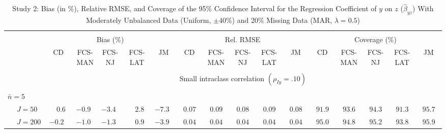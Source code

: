 \begin{sidewaystable}
\begin{threeparttable}
\setlength{\tabcolsep}{1.0pt}
\renewcommand{\arraystretch}{0.95}
\footnotesize
\caption{\small Study 2: Bias (in \%), Relative RMSE, and Coverage of the 95\% Confidence Interval for the Regression Coefficient of $y$ on $z$ ($\hat\beta_{yz}$) With Moderately Unbalanced Data (Uniform, $\pm 40\%$) and 20\% Missing Data (MAR, $\lambda=0.5$)}
\begin{tabular}{llccccccccccccccc}
\hline\\[-1.8ex]
& & \multicolumn{5}{c}{Bias (\%)} & \multicolumn{5}{c}{Rel. RMSE} & \multicolumn{5}{c}{Coverage (\%)} \\ \cmidrule(r){3-7}\cmidrule(r){8-12}\cmidrule(r){13-17}
 &  & CD & \makecell{FCS-\\MAN} & \makecell{FCS-\\NJ} & \makecell{FCS-\\LAT} & JM & CD & \makecell{FCS-\\MAN} & \makecell{FCS-\\NJ} & \makecell{FCS-\\LAT} & JM & CD & \makecell{FCS-\\MAN} & \makecell{FCS-\\NJ} & \makecell{FCS-\\LAT} & \multicolumn{1}{c}{JM} \\ 
[0.4ex]\hline\\[-1.8ex]
& & \multicolumn{15}{c}{Small intraclass correlation $(\rho_{Iy}=.10)$} \\[0.6ex]\hline\\[-1.8ex]
\multicolumn{4}{l}{$\bar{n}=5$} \\  & \nopagebreak $\;J=50$  & $\phantom{-}0.6\phantom{0}$ & ${-}0.9\phantom{0}$ & ${-}3.4\phantom{0}$ & $\phantom{-}2.8\phantom{0}$ & ${-}7.3\phantom{0}$ & $\phantom{0}0.07\phantom{0}$ & $\phantom{0}0.09\phantom{0}$ & $\phantom{0}0.08\phantom{0}$ & $\phantom{0}0.09\phantom{0}$ & $\phantom{0}0.08\phantom{0}$ & $\phantom{0}91.9\phantom{0}$ & $\phantom{0}93.6\phantom{0}$ & $\phantom{0}94.3\phantom{0}$ & $\phantom{0}91.3\phantom{0}$ & $\phantom{0}95.7\phantom{0}$ \\
 & \nopagebreak $\;J=200$  & ${-}0.2\phantom{0}$ & ${-}1.0\phantom{0}$ & ${-}1.3\phantom{0}$ & $\phantom{-}0.9\phantom{0}$ & ${-}3.9\phantom{0}$ & $\phantom{0}0.04\phantom{0}$ & $\phantom{0}0.04\phantom{0}$ & $\phantom{0}0.04\phantom{0}$ & $\phantom{0}0.04\phantom{0}$ & $\phantom{0}0.04\phantom{0}$ & $\phantom{0}95.0\phantom{0}$ & $\phantom{0}94.8\phantom{0}$ & $\phantom{0}95.2\phantom{0}$ & $\phantom{0}93.8\phantom{0}$ & $\phantom{0}95.9\phantom{0}$ \\

\end{tabular}
\end{threeparttable}
\end{sidewaystable}
